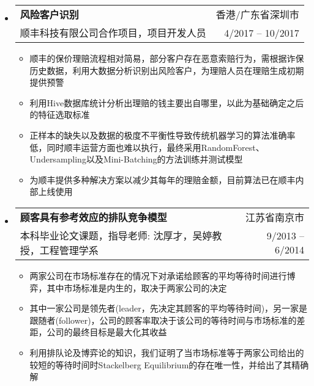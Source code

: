 \documentclass[letterpaper,9pt]{ctexart}
\makeatletter
\newcommand{\resitem}[1]{\item #1 \vspace{-2pt}}
\newcommand{\ressubheading}[4]{
\begin{tabular*}{6.5in}{l@{\extracolsep{\fill}}r}
    \textbf{#1} & #2 \\
    #3 & #4 \\
\end{tabular*}\vspace{-6pt}}
\makeatother
\begin{document}
\begin{itemize}
\item 
\ressubheading{风险客户识别}{香港/广东省深圳市}{顺丰科技有限公司合作项目，项目开发人员}{4/2017 -- 10/2017}
\begin{itemize}
\resitem{顺丰的保价理赔流程相对简易，部分客户存在恶意索赔行为，需根据诈保历史数据，利用大数据分析识别出风险客户，为理赔人员在理赔生成初期提供预警}
\resitem{利用Hive数据库统计分析出理赔的钱主要出自哪里，以此为基础确定之后的特征选取标准}
\resitem{正样本的缺失以及数据的极度不平衡性导致传统机器学习的算法准确率低，同时顺丰运营方面也难以执行，最终采用RandomForest、Undersampling以及Mini-Batching的方法训练并测试模型}
\resitem{为顺丰提供多种解决方案以减少其每年的理赔金额，目前算法已在顺丰内部上线使用}
\end{itemize}








\item 
\ressubheading{顾客具有参考效应的排队竞争模型}{江苏省南京市}{本科毕业论文课题，指导老师: 沈厚才，吴婷教授，工程管理学系}{9/2013 -- 6/2014}
\begin{itemize}
\resitem{两家公司在市场标准存在的情况下对承诺给顾客的平均等待时间进行博弈，其中市场标准是内生的，取决于两家公司的决定}
\resitem{其中一家公司是领先者(leader，先决定其顾客的平均等待时间)，另一家是跟随者(follower)，公司的顾客率取决于该公司的等待时间与市场标准的差距，公司的最终目标是最大化其收益}
\resitem{利用排队论及博弈论的知识，我们证明了当市场标准等于两家公司给出的较短的等待时间时Stackelberg Equilibrium的存在唯一性，并给出了其精确解}
\end{itemize}



\end{itemize}
\end{document}
